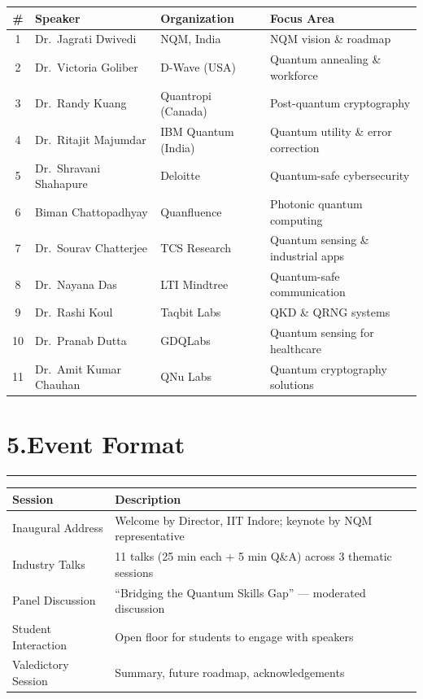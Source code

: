 \documentclass[12pt,a4paper]{article}
\begin{document}
\begin{table}[h!]
\centering
\small
\begin{tabularx}{\textwidth}{c l l X}
  \toprule
  \textbf{\#} & \textbf{Speaker} & \textbf{Organization} & \textbf{Focus Area} \\
  \midrule
  1  & Dr.\ Jagrati Dwivedi      & NQM, India          & NQM vision \& roadmap \\
  2  & Dr.\ Victoria Goliber     & D-Wave (USA)        & Quantum annealing \& workforce \\
  3  & Dr.\ Randy Kuang          & Quantropi (Canada)  & Post-quantum cryptography \\
  4  & Dr.\ Ritajit Majumdar     & IBM Quantum (India) & Quantum utility \& error correction \\
  5  & Dr.\ Shravani Shahapure   & Deloitte             & Quantum-safe cybersecurity \\
  6  & Biman Chattopadhyay       & Quanfluence         & Photonic quantum computing \\
  7  & Dr.\ Sourav Chatterjee    & TCS Research        & Quantum sensing \& industrial apps \\
  8  & Dr.\ Nayana Das           & LTI Mindtree        & Quantum-safe communication \\
  9  & Dr.\ Rashi Koul           & Taqbit Labs         & QKD \& QRNG systems \\
  10 & Dr.\ Pranab Dutta         & GDQLabs             & Quantum sensing for healthcare \\
  11 & Dr.\ Amit Kumar Chauhan   & QNu Labs            & Quantum cryptography solutions \\
  \bottomrule
\end{tabularx}
\end{table}

\section*{5.\quad Event Format}
\vspace{-4pt}\hrule\vspace{6pt}

\begin{table}[h!]
\centering
\begin{tabularx}{\textwidth}{l X}
  \toprule
  \textbf{Session} & \textbf{Description} \\
  \midrule
  Inaugural Address     & Welcome by Director, IIT Indore; keynote by NQM representative \\
  Industry Talks        & 11 talks (25 min each + 5 min Q\&A) across 3 thematic sessions \\
  Panel Discussion      & ``Bridging the Quantum Skills Gap'' --- moderated discussion \\
  Student Interaction   & Open floor for students to engage with speakers \\
  Valedictory Session   & Summary, future roadmap, acknowledgements \\
  \bottomrule
\end{tabularx}
\end{table}
\end{document}

